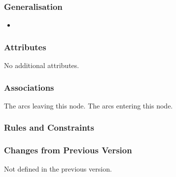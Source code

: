\subsubsection{Generalisation}

\begin{itemize}
\item {}
\end{itemize}

\subsubsection{Attributes}

No additional attributes.

\subsubsection{Associations}

\begin{attributes}
   The arcs leaving this node.
   The arcs entering this node.
\end{attributes}

\subsubsection{Rules and Constraints}

\begin{valrules}
\end{valrules}


\subsubsection{Changes from Previous Version}

Not defined in the previous version.

\label{defn:SBGNArc}

